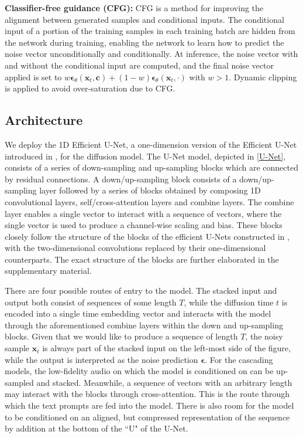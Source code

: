 \documentclass[nohyperref]{article}
\theoremstyle{plain}
\theoremstyle{definition}
\theoremstyle{remark}
\begin{document}
\textbf{Classifier-free guidance (CFG):} CFG \cite{ho2022classifier} is a method for improving the alignment between generated samples and conditional inputs. The conditional input of a portion of the training samples in each training batch are hidden from the network during training, enabling the network to learn how to predict the noise vector unconditionally and conditionally. At inference, the noise vector with and without the conditional input are computed, and the final noise vector applied is set to $w \bm{\epsilon}_\theta(\mathbf{x}_t, \mathbf{c}) + (1 - w) \bm{\epsilon}_\theta(\mathbf{x}_t, \cdot) $ with $w > 1$. Dynamic clipping \cite{saharia2022photorealistic} is applied to avoid over-saturation due to CFG.

\subsection{Architecture}

We deploy the 1D Efficient U-Net, a one-dimension version of the Efficient U-Net introduced in \cite{saharia2022photorealistic}, for the diffusion model. The U-Net model, depicted in \cref{U-Net}, consists of a series of down-sampling and up-sampling blocks which are connected by residual connections. A down/up-sampling block consists of a down/up-sampling layer followed by a series of blocks obtained by composing 1D convolutional layers, self/cross-attention layers and combine layers. The combine layer enables a single vector to interact with a sequence of vectors, where the single vector is used to produce a channel-wise scaling and bias. These blocks closely follow the structure of the blocks of the efficient U-Nets constructed in \cite{saharia2022photorealistic}, with the two-dimensional convolutions replaced by their one-dimensional counterparts. The exact structure of the blocks are further elaborated in the supplementary material.

There are four possible routes of entry to the model. The stacked input and output both consist of sequences of some length $T$, while the diffusion time $t$ is encoded into a single time embedding vector and interacts with the model through the aforementioned combine layers within the down and up-sampling blocks. Given that we would like to produce a sequence of length $T$, the noisy sample $\mathbf{x}_t$ is always part of the stacked input on the left-most side of the figure, while the output is interpreted as the noise prediction $\bm\epsilon$. For the cascading models, the low-fidelity audio on which the model is conditioned on can be up-sampled and stacked. Meanwhile, a sequence of vectors with an arbitrary length may interact with the blocks through cross-attention. This is the route through which the text prompts are fed into the model. There is also room for the model to be conditioned on an aligned, but compressed representation of the sequence by addition at the bottom of the ``U" of the U-Net.
\end{document}
